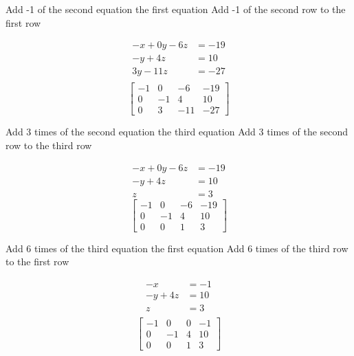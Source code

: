 \documentclass[a4paper, 12pt]{article}
\begin{document}
\begin{multicols}{2} 
Add -1 of the second equation the first equation
\break
Add -1 of the second row to the first row
\end{multicols} 

\begin{multicols}{2}
\begin{align*}
-x +  0y  - 6z &= -19 \\
-y + 4z &= 10 \\
3y - 11z  &= -27\\
\end{align*}
\break
\[ \left[ {\begin{array}{cccc}
-1 & 0 & -6 & -19 \\
0 & -1 & 4 & 10 \\
0 & 3 & -11 & -27 
\end{array}} \right] \]
\end{multicols} 

\begin{multicols}{2} 
Add 3 times of the second equation the third equation
\break
Add 3 times  of the second row to the third row
\end{multicols} 

\begin{multicols}{2}
\begin{align*}
-x +  0y  - 6z &= -19 \\
-y + 4z &= 10 \\
z  &= 3
\end{align*}
\break
\[ \left[ {\begin{array}{cccc}
-1 & 0 & -6 & -19 \\
0 & -1 & 4 & 10 \\
0 & 0 & 1  & 3 
\end{array}} \right] \]
\end{multicols} 

\begin{multicols}{2} 
Add 6 times of the third equation the first equation
\break
Add 6 times of the third row to the first row
\end{multicols} 

\begin{multicols}{2}
\begin{align*}
-x &= -1 \\
-y + 4z &= 10 \\
z  &= 3\\
\end{align*}
\break
\[ \left[ {\begin{array}{cccc}
-1 & 0 & 0  & -1 \\
0 & -1 & 4 & 10 \\
0 & 0 & 1  & 3 
\end{array}} \right] \]
\end{multicols} 
\end{document}
